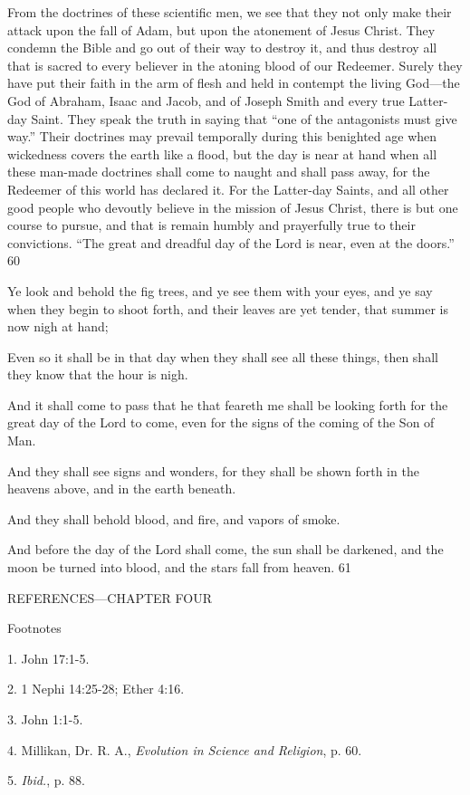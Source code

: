 From the doctrines of these scientific men, we see that they not only make their attack upon
the fall of Adam, but upon the atonement of Jesus Christ. They condemn the Bible and go out
of their way to destroy it, and thus destroy all that is sacred to every believer in the atoning
blood of our Redeemer. Surely they have put their faith in the arm of flesh and held in
contempt the living God—the God of Abraham, Isaac and Jacob, and of Joseph Smith and
every true Latter-day Saint. They speak the truth in saying that ``one of the antagonists must
give way.'' Their doctrines may prevail temporally during this benighted age when
wickedness covers the earth like a flood, but the day is near at hand when all these man-made
doctrines shall come to naught and shall pass away, for the Redeemer of this world has
declared it. For the Latter-day Saints, and all other good people who devoutly believe in the
mission of Jesus Christ, there is but one course to pursue, and that is remain humbly and
prayerfully true to their convictions. ``The great and dreadful day of the Lord is near, even at
the doors.'' 60

Ye look and behold the fig trees, and ye see them with your eyes, and ye say when they begin
to shoot forth, and their leaves are yet tender, that summer is now nigh at hand;

Even so it shall be in that day when they shall see all these things, then shall they know that
the hour is nigh.

And it shall come to pass that he that feareth me shall be looking forth for the great day of the
Lord to come, even for the signs of the coming of the Son of Man.

And they shall see signs and wonders, for they shall be shown forth in the heavens above,
and in the earth beneath.

And they shall behold blood, and fire, and vapors of smoke.

And before the day of the Lord shall come, the sun shall be darkened, and the moon be
turned into blood, and the stars fall from heaven. 61

\newpage
REFERENCES—CHAPTER FOUR

Footnotes

1. John 17:1-5.

2. 1 Nephi 14:25-28; Ether 4:16.

3. John 1:1-5.

4. Millikan, Dr. R. A., \textit{Evolution in Science and Religion}, p. 60.

5. \textit{Ibid.}, p. 88.

